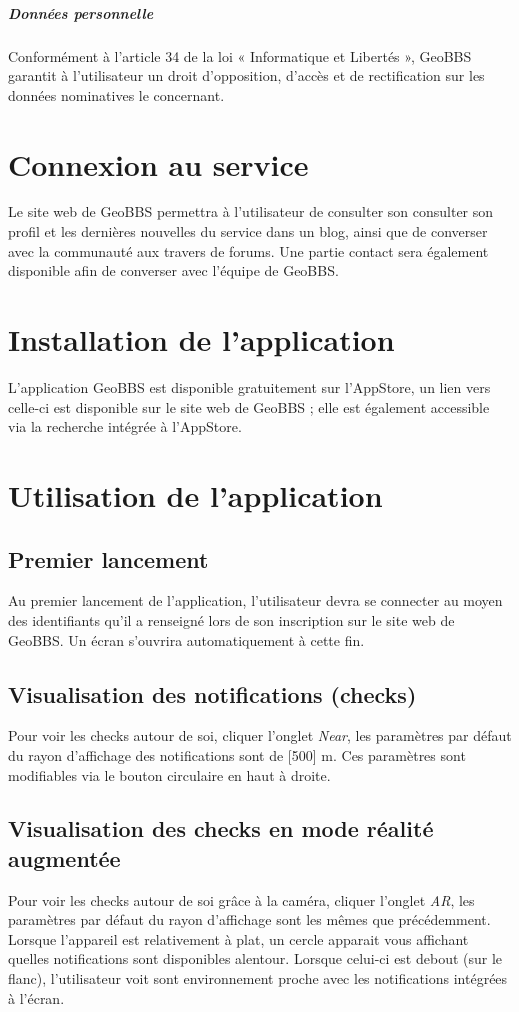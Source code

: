 \documentclass[a4paper,12pt]{report}
\begin{document}
\begin{onehalfspace}
\paragraph*{Données personnelle}
Conformément à l'article 34 de la loi « Informatique et Libertés », GeoBBS garantit à l'utilisateur un droit d'opposition, d'accès et de rectification sur les données nominatives le concernant. 

\chapter{Connexion au service}
Le site web de GeoBBS permettra à l'utilisateur de consulter son consulter son profil et les dernières nouvelles du service dans un blog, ainsi que de converser avec la communauté aux travers de forums. Une partie contact sera également disponible afin de converser avec l'équipe de GeoBBS.

\chapter{Installation de l'application}
L'application GeoBBS est disponible gratuitement sur l'AppStore, un lien vers celle-ci est disponible sur le site web de GeoBBS ; elle est également accessible via la recherche intégrée à l'AppStore.

\chapter{Utilisation de l'application}
\section{Premier lancement}
Au premier lancement de l'application, l'utilisateur devra se connecter au moyen des identifiants qu'il a renseigné lors de son inscription sur le site web de GeoBBS.
Un écran s'ouvrira automatiquement à cette fin.

\section{Visualisation des notifications (checks)}
Pour voir les checks autour de soi, cliquer l'onglet \emph{Near}, les paramètres par défaut du rayon d'affichage des notifications sont de [500] m.
Ces paramètres sont modifiables via le bouton circulaire en haut à droite.

\section{Visualisation des checks en mode réalité augmentée}
Pour voir les checks autour de soi grâce à la caméra, cliquer l'onglet \emph{AR}, les paramètres par défaut du rayon d'affichage sont les mêmes que précédemment.
Lorsque l'appareil est relativement à plat, un cercle apparait vous affichant quelles notifications sont disponibles alentour.
Lorsque celui-ci est debout (sur le flanc), l'utilisateur voit sont environnement proche avec les notifications intégrées à l'écran.


\end{onehalfspace}
\end{document}
